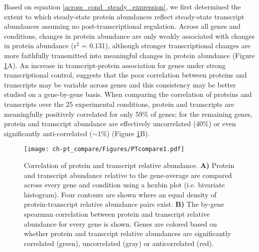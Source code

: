 Based on equation \ref{across_cond_steady_expression}, we first determined the extent to which steady-state protein abundances reflect steady-state transcript abundances assuming no post-transcriptional regulation.  Across all genes and conditions, changes in protein abundance are only weakly associated with changes in protein abundance (r$^{2}$ = 0.131), although stronger transcriptional changes are more faithfully transmitted into meaningful changes in protein abundance (Figure \ref{ptscatter}A).  An increase in transcript-protein association for genes under strong transcriptional control, suggests that the poor correlation between proteins and transcripts may be variable across genes and this consistency may be better studied on a gene-by-gene basis.  When comparing the correlation of proteins and transcripts over the 25 experimental conditions, protein and transcripts are meaningfully positively correlated for only 59\% of genes; for the remaining genes, protein and transcript abundance are effectively uncorrelated (40\%) or even significantly anti-correlated ($\sim$1\%) (Figure \ref{ptscatter}B).

\begin{figure}[h!]
\begin{center}
\texttt{[image: ch-pt\_compare/Figures/PTcompare1.pdf]}
\caption{Correlation of protein and transcript relative abundance.  \textbf{A)} Protein and transcript abundance relative to the gene-average are compared across every gene and condition using a hexbin plot (i.e. bivariate histogram).  Four contours are shown where an equal density of protein-transcript relative abundance pairs exist.  \textbf{B)} The by-gene spearman correlation between protein and transcript relative abundance for every gene is shown.  Genes are colored based on whether protein and transcript relative abundances are significantly correlated (green), uncorrelated (gray) or anticorrelated (red).}
\label{ptscatter}
\end{center}
\end{figure}

